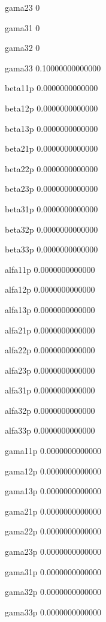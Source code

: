  gama23 
 0 
  
 gama31 
 0 
  
 gama32 
 0 
  
 gama33 
  0.10000000000000 
  
 beta11p
   0.0000000000000 
  
 beta12p
   0.0000000000000 
  
 beta13p
   0.0000000000000 
  
 beta21p
   0.0000000000000 
  
 beta22p
   0.0000000000000 
  
 beta23p
   0.0000000000000 
  
 beta31p
   0.0000000000000 
  
 beta32p
   0.0000000000000 
  
 beta33p
   0.0000000000000 
  
 alfa11p
   0.0000000000000 
  
 alfa12p
   0.0000000000000 
  
 alfa13p
   0.0000000000000 
  
 alfa21p
   0.0000000000000 
  
 alfa22p
   0.0000000000000 
  
 alfa23p
   0.0000000000000 
  
 alfa31p
   0.0000000000000 
  
 alfa32p
   0.0000000000000 
  
 alfa33p
   0.0000000000000 
  
 gama11p
   0.0000000000000 
  
 gama12p
   0.0000000000000 
  
 gama13p
   0.0000000000000 
  
 gama21p
   0.0000000000000 
  
 gama22p
   0.0000000000000 
  
 gama23p
   0.0000000000000 
  
 gama31p
   0.0000000000000 
  
 gama32p
   0.0000000000000 
  
 gama33p
   0.0000000000000 
  
